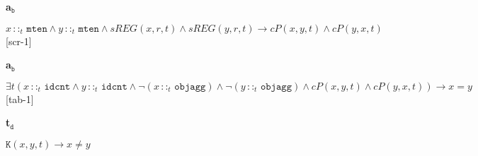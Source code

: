 \documentclass[ao]{iosart2x}
\newcommand{\nb}[1]{\textcolor{red}{$|$}\marginpar{\hspace*{-0cm}\parbox{20mm}{\scriptsize\raggedright\textcolor{red}{#1}}}}
\newcommand{\bflist}{\begin{list}{}{\setlength{\topsep}{2mm}\setlength{\parsep}{0mm}\setlength{\leftmargin}{9.2mm}\setlength{\labelwidth}{8mm}}}
\newcommand{\eflist}{\end{list}}
\newcommand{\bfoAxLabel}{\textrm{a$_\texttt{b}$}}
\newcommand{\dolceAxLabelscript}{\scriptsize \textrm{a$_\texttt{d}$}}
\newcommand{\dolceThrLabel}{\textrm{t$_\texttt{d}$}}
\newcommand{\dbDefLabel}{\textrm{d$_\texttt{db}$}}
\newcommand{\dbThrLabel}{\textrm{t$_\texttt{db}$}}
\newcounter{cntaxb}
\newcommand{\bfoax}[1]{\refstepcounter{cntaxb}\begin{small}{\bf \bfoAxLabel\thecntaxb\label{#1}}\end{small}}
\newcounter{cntax}
\newcommand{\dolceax}[1]{\refstepcounter{cntax}\begin{small}{\bf \dolceAxLabelscript\thecntax\label{#1}}\end{small}}
\newcounter{cntthr}
\newcommand{\dolceth}[1]{\refstepcounter{cntthr}\begin{small}{\bf \dolceThrLabel\thecntthr\label{#1}}\end{small}}
\newcounter{cntdbth}
\newcommand{\dbth}[1]{\refstepcounter{cntdbth}\begin{small}{\bf \dbThrLabel\thecntdbth\label{#1}}\end{small}}
\newcommand{\refdbdf}[1]{({\dbDefLabel}\ref{#1})}
\newcommand{\pr}[1]{\mathtt{#1}}
\newcommand{\prbfo}[1]{{\textit{{#1}}}}
\newcommand{\cn}[1]{\mathtt{#1}}
\newcommand{\ifif}{\leftrightarrow}
\newcommand {\thdolcedbmap} {\ensuremath{\mathfrak{D}_\texttt{b}}}
\newcommand {\Kd} {\ensuremath{\pr{K}}}
\newcommand {\SLCd} {\ensuremath{\pr{SLC}}}
\newcommand{\idcntbcat}{\cn{idcnt}}
\newcommand{\mtenbcat}{\cn{mten}}
\newcommand{\objaggbcat}{\cn{objagg}}
\newcommand{\procbcat}{\cn{proc}}
\newcommand{\pbndbcat}{\cn{pbnd}}
\newcommand{\bfocpart}{\prbfo{cP}}
\newcommand{\bfoopart}{\prbfo{oP}}
\newcommand{\bfoexist}{\prbfo{EX}}
\newcommand{\bfoiof}[1]{{\,::_{#1\:\!}}}
\newcommand{\bfosregof}{\prbfo{sREG}}
\newcommand{\bfosregofocc}{\prbfo{sREG_O}}
\newcommand{\bfostregof}{\prbfo{stREG}}
\begin{document}
%
\bflist
\item[\bfoax{sregof_maten}]  $x \bfoiof{t} \mtenbcat \land y \bfoiof{t} \mtenbcat \land \bfosregof(x,r,t) \land \bfosregof(y,r,t) \to \bfocpart(x,y,t) \land \bfocpart(y,x,t)$ 
\hfill {\scriptsize [scr-1]}

\item[\bfoax{id_idcnt}] $\exists t(x \bfoiof{t} \idcntbcat \land y \bfoiof{t} \idcntbcat \land \neg(x \bfoiof{t} \objaggbcat) \land \neg(y \bfoiof{t} \objaggbcat) \land  \bfocpart(x,y,t) \land \bfocpart(y,x,t)) \to x=y$  
\hfill {\scriptsize [tab-1]}


\item[\dolceth{Kd_to_diff}] $\Kd(x,y,t) \to x \neq y$ 
\eflist
\end{document}
